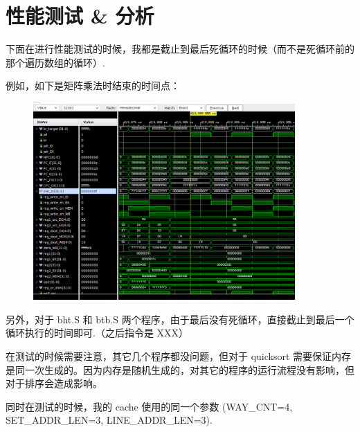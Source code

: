 \documentclass{article}
\begin{document}
\section{性能测试 \& 分析}
下面在进行性能测试的时候，我都是截止到最后死循环的时候（而不是死循环前的那个遍历数组的循环）.

例如，如下是矩阵乘法时结束的时间点：
\begin{figure}[H]
  \centering
  \includegraphics[width=10cm]{simulation.png}
\end{figure}

另外，对于 bht.S 和 btb.S 两个程序，由于最后没有死循环，直接截止到最后一个循环执行的时间即可.（之后指令是 XXX）

在测试的时候需要注意，其它几个程序都没问题，但对于 quicksort 需要保证内存是同一次生成的。因为内存是随机生成的，对其它的程序的运行流程没有影响，但对于排序会造成影响。

同时在测试的时候，我的 cache 使用的同一个参数 (WAY\_CNT=4, SET\_ADDR\_LEN=3, LINE\_ADDR\_LEN=3).
\end{document}
